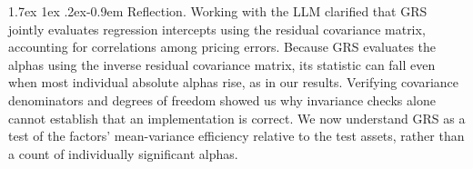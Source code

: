 \documentclass[11pt]{article}
\makeatletter
\renewcommand\paragraph{\@startsection{paragraph}{4}{0pt}%
  {1.7ex \@plus 1ex \@minus .2ex}{-0.9em}%
  {\normalfont\bfseries\normalsize\color{psink}}}
\makeatother
\begin{document}
\paragraph{Reflection.} Working with the LLM clarified that GRS jointly
evaluates regression intercepts using the residual covariance matrix,
accounting for correlations among pricing errors. Because GRS evaluates the
alphas using the inverse residual covariance matrix, its statistic can fall
even when most individual absolute alphas rise, as in our results. Verifying
covariance denominators and degrees of freedom showed us why invariance
checks alone cannot establish that an implementation is correct. We now
understand GRS as a test of the factors' mean-variance efficiency relative to
the test assets, rather than a count of individually significant alphas.
\end{document}
